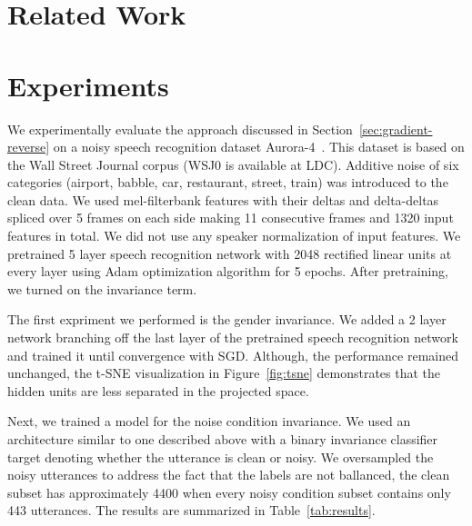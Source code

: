 \documentclass{article}
\begin{document}
\section{Related Work}

\section{Experiments}
We experimentally evaluate the approach discussed in Section~\ref{sec:gradient-reverse} 
on a noisy speech recognition dataset Aurora-4~\cite{parihar2002aurora}. This dataset
is based on the Wall Street Journal corpus (WSJ0 is available at LDC). Additive noise of 
six categories (airport, babble, car, restaurant, street, train) was introduced to the 
clean data. We used mel-filterbank features with their deltas and delta-deltas spliced
over 5 frames on each side making 11 consecutive frames and 1320 input features in total. 
We did not use any speaker normalization of input features. We pretrained 5 layer
speech recognition network with 2048 rectified linear units at every layer using Adam 
optimization algorithm for 5 epochs. After pretraining, we turned on the invariance term.

The first expriment we performed is the gender invariance. We added a 2 layer network 
branching off the last layer of the pretrained speech recognition network and 
trained it until convergence with SGD. Although, the performance remained unchanged,
the t-SNE visualization in Figure~\ref{fig:tsne} demonstrates that the hidden units
are less separated in the projected space.

Next, we trained a model for the noise condition invariance. We used an architecture
similar to one described above with a binary invariance classifier target denoting 
whether the utterance is clean or noisy. We oversampled the noisy utterances to 
address the fact that the labels are not ballanced, the clean subset has approximately 4400
when every noisy condition subset contains only 443 utterances. The results are
summarized in Table~\ref{tab:results}.
\end{document}
